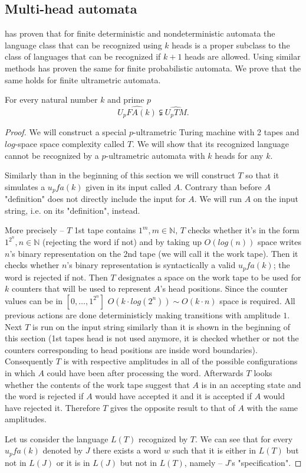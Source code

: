 \documentclass{llncs}
\begin{document}
\subsection{Multi-head automata}
\citet{Monien1980} has proven that for finite deterministic and nondeterministic automata the language class that can be recognized using $k$ heads is a proper subclass to the class of languages that can be recognized if $k+1$ heads are allowed. Using similar methods \citet{Macarie1995} has proven the same for finite probabilistic automata. We prove that the same holds for finite ultrametric automata.

\begin{theorem} \label{atdalisana}
For every natural number $k$ and prime $p$
\[
	\widehat{U_pFA(k)} \subsetneqq \widehat{U_pTM}.
\]
\end{theorem}
\begin{proof}
We will construct a special $p$-ultrametric Turing machine with 2 tapes and $log$-space space complexity called $T$. We will show that its recognized language cannot be recognized by a $p$-ultrametric automata with $k$ heads for any $k$.

Similarly than in the beginning of this section %
we will construct $T$ so that it simulates a $u_pfa(k)$ given in its input called $A$. Contrary than before $A$ "definition" does not directly include the input for $A$. We will run $A$ on the input string, i.e. on its "definition", instead.

More precisely -- $T$ 1st tape contains $1^m, m \in \mathbb{N}$, $T$ checks whether it's in the form $1^{2^n}, n \in \mathbb{N}$ (rejecting the word if not) and by taking up $O(log(n))$ space writes $n$'s binary representation on the 2nd tape (we will call it the work tape). Then it checks whether $n$'s binary representation is syntactically a valid $u_pfa(k)$; the word is rejected if not. Then $T$ designates a space on the work tape to be used for $k$ counters that will be used to represent $A$'s head positions. Since the counter values can be in $\left[0, \ldots, 1^{2^n} \right]$ $O(k \cdot log(2^n)) \sim O(k \cdot n)$ space is required.
All previous actions are done deterministicly making transitions with amplitude $1$. Next $T$ is run on the input string similarly than it is shown in the beginning of this section (1st tapes head is not used anymore, it is checked whether or not the counters corresponding to head positions are inside word boundaries). Consequently $T$ is with respective amplitudes in all of the possible configurations in which $A$ could have been after processing the word. Afterwards $T$ looks whether the contents of the work tape suggest that $A$ is in an accepting state and the word is rejected if $A$ would have accepted it and it is accepted if $A$ would have rejected it. Therefore $T$ gives the opposite result to that of $A$ with the same amplitudes.

Let us consider the language $L(T)$ recognized by $T$. We can see that for every $u_pfa(k)$ denoted by $J$ there exists a word $w$ such that it is either in $L(T)$ but not in $L(J)$ or it is in $L(J)$ but not in $L(T)$, namely -- $J$'s "specification".
\end{proof}
\end{document}
